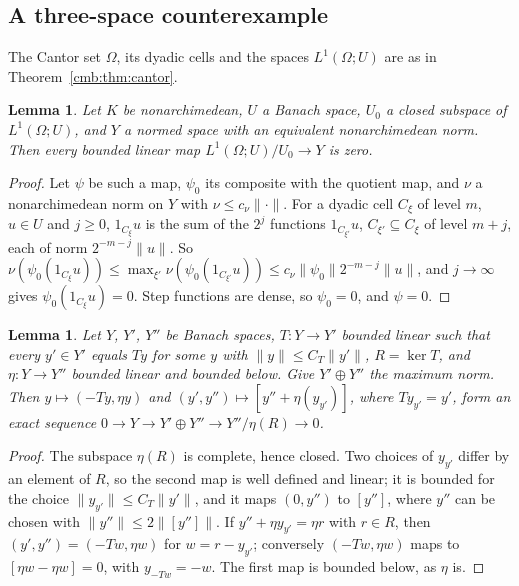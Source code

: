 \documentclass[11pt]{amsart}
\newtheorem{lemma}[theorem]{Lemma}
\theoremstyle{definition}
\theoremstyle{remark}
\numberwithin{equation}{section}
\newcommand{\norm}[1]{\lVert #1\rVert}
\theoremstyle{plain}
\theoremstyle{definition}
\theoremstyle{plain}
\begin{document}
\subsection{A three-space counterexample}\label{ocl:ssec:three-space}

The Cantor set $\Omega$, its dyadic cells and the spaces $L^1(\Omega;U)$ are as in Theorem~\ref{cmb:thm:cantor}.

\begin{lemma}\label{ocl:lem:no-operators}
Let $K$ be nonarchimedean, $U$ a Banach space, $U_0$ a closed subspace of $L^1(\Omega;U)$, and $Y$ a normed space with
an equivalent nonarchimedean norm. Then every bounded linear map $L^1(\Omega;U)/U_0\to Y$ is zero.
\end{lemma}

\begin{proof}
Let $\psi$ be such a map, $\psi_0$ its composite with the quotient map, and $\nu$ a nonarchimedean norm on $Y$ with
$\nu\le c_\nu\norm\cdot$. For a dyadic cell $C_\xi$ of level $m$, $u\in U$ and $j\ge0$, $1_{C_\xi}u$ is the sum of the
$2^j$ functions $1_{C_{\xi'}}u$, $C_{\xi'}\subseteq C_\xi$ of level $m+j$, each of norm $2^{-m-j}\norm u$. So
$\nu(\psi_0(1_{C_\xi}u))\le\max_{\xi'}\nu(\psi_0(1_{C_{\xi'}}u))\le c_\nu\norm{\psi_0}2^{-m-j}\norm u$, and $j\to\infty$
gives $\psi_0(1_{C_\xi}u)=0$. Step functions are dense, so $\psi_0=0$, and $\psi=0$.
\end{proof}

\begin{lemma}\label{ocl:lem:dilution}
Let $Y$, $Y'$, $Y''$ be Banach spaces, $T\colon Y\to Y'$ bounded linear such that every $y'\in Y'$ equals $Ty$ for some
$y$ with $\norm y\le C_T\norm{y'}$, $R=\ker T$, and $\eta\colon Y\to Y''$ bounded linear and bounded below. Give
$Y'\oplus Y''$ the maximum norm. Then $y\mapsto(-Ty,\eta y)$ and $(y',y'')\mapsto[y''+\eta(y_{y'})]$, where
$Ty_{y'}=y'$, form an exact sequence $0\to Y\to Y'\oplus Y''\to Y''/\eta(R)\to0$.
\end{lemma}

\begin{proof}
The subspace $\eta(R)$ is complete, hence closed. Two choices of $y_{y'}$ differ by an element of $R$, so the second
map is well defined and linear; it is bounded for the choice $\norm{y_{y'}}\le C_T\norm{y'}$, and it maps $(0,y'')$ to
$[y'']$, where $y''$ can be chosen with $\norm{y''}\le2\norm{[y'']}$. If $y''+\eta y_{y'}=\eta r$ with $r\in R$, then
$(y',y'')=(-Tw,\eta w)$ for $w=r-y_{y'}$; conversely $(-Tw,\eta w)$ maps to $[\eta w-\eta w]=0$, with $y_{-Tw}=-w$.
The first map is bounded below, as $\eta$ is.
\end{proof}
\end{document}
